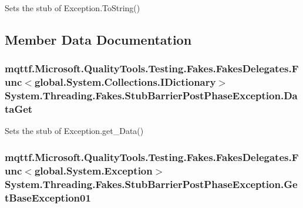 Sets the stub of Exception.\-To\-String()



\subsection{Member Data Documentation}
\hypertarget{class_system_1_1_threading_1_1_fakes_1_1_stub_barrier_post_phase_exception_af89ddf4d9fce2450a1a2344416cb108c}{
\subsubsection[{Data\-Get}]{\setlength{\rightskip}{0pt plus 5cm}mqttf.\-Microsoft.\-Quality\-Tools.\-Testing.\-Fakes.\-Fakes\-Delegates.\-Func$<$global.\-System.\-Collections.\-I\-Dictionary$>$ System.\-Threading.\-Fakes.\-Stub\-Barrier\-Post\-Phase\-Exception.\-Data\-Get}}\label{class_system_1_1_threading_1_1_fakes_1_1_stub_barrier_post_phase_exception_af89ddf4d9fce2450a1a2344416cb108c}


Sets the stub of Exception.\-get\-\_\-\-Data()

\hypertarget{class_system_1_1_threading_1_1_fakes_1_1_stub_barrier_post_phase_exception_a1d463c01cf6f56ed1621d3b82efcb495}{
\subsubsection[{Get\-Base\-Exception01}]{\setlength{\rightskip}{0pt plus 5cm}mqttf.\-Microsoft.\-Quality\-Tools.\-Testing.\-Fakes.\-Fakes\-Delegates.\-Func$<$global.\-System.\-Exception$>$ System.\-Threading.\-Fakes.\-Stub\-Barrier\-Post\-Phase\-Exception.\-Get\-Base\-Exception01}}\label{class_system_1_1_threading_1_1_fakes_1_1_stub_barrier_post_phase_exception_a1d463c01cf6f56ed1621d3b82efcb495}


